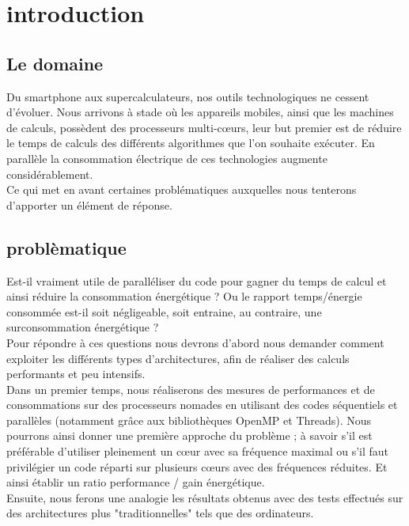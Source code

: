 \chapter{introduction}

	\section{Le domaine}
		Du smartphone aux supercalculateurs, nos outils technologiques ne cessent d'évoluer. Nous arrivons à stade où les appareils mobiles, ainsi que les machines de calculs, possèdent des processeurs multi-c\oe{}urs, leur but premier est de réduire le temps de calculs des différents algorithmes que l'on souhaite exécuter. En parallèle la consommation électrique de ces technologies augmente considérablement. \\
 		Ce qui met en avant certaines problématiques auxquelles nous tenterons d'apporter un élément de réponse. 

	\section{problèmatique}
		Est-il vraiment utile de paralléliser du code pour gagner du temps de calcul et ainsi réduire la consommation énergétique ? Ou le rapport temps/énergie consommée est-il soit négligeable, soit entraine, au contraire, une surconsommation énergétique ? \\

		Pour répondre à ces questions nous devrons d'abord nous demander comment exploiter les différents types d'architectures, afin de réaliser des calculs performants et peu intensifs.\\

		Dans un premier temps, nous réaliserons des mesures de performances et de consommations sur des processeurs nomades en utilisant des codes séquentiels et parallèles (notamment grâce aux bibliothèques OpenMP et Threads). Nous pourrons ainsi donner une première approche du problème ; à savoir s'il est préférable d'utiliser pleinement un c\oe{}ur avec sa fréquence maximal ou s'il faut privilégier un code réparti sur plusieurs c\oe{}urs avec des fréquences réduites. Et ainsi établir un ratio performance / gain énergétique.\\

		Ensuite, nous ferons une analogie les résultats obtenus avec des tests effectués sur des architectures plus "traditionnelles" tels que des ordinateurs.\\

